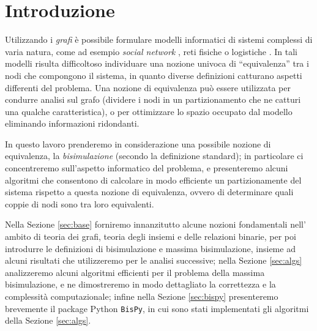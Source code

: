 \section{Introduzione}
Utilizzando i \emph{grafi} è possibile formulare modelli informatici di sistemi complessi di varia natura, come ad esempio \emph{social network} \cite{twitter}, reti fisiche \cite{electric} o logistiche \cite{supply}. In tali modelli risulta difficoltoso individuare una nozione univoca di ``equivalenza'' tra i nodi che compongono il sistema, in quanto diverse definizioni catturano aspetti differenti del problema. Una nozione di equivalenza può essere utilizzata per condurre analisi sul grafo (dividere i nodi in un partizionamento che ne catturi una qualche caratteristica), o per ottimizzare lo spazio occupato dal modello eliminando informazioni ridondanti.

In questo lavoro prenderemo in considerazione una possibile nozione di equivalenza, la \emph{bisimulazione} (secondo la definizione standard); in particolare ci concentreremo sull'aspetto informatico del problema, e presenteremo alcuni algoritmi che consentono di calcolare in modo efficiente un partizionamente del sistema rispetto a questa nozione di equivalenza, ovvero di determinare quali coppie di nodi sono tra loro equivalenti.

Nella Sezione \ref{sec:base} forniremo innanzitutto alcune nozioni fondamentali nell' ambito di teoria dei grafi, teoria degli insiemi e delle relazioni binarie, per poi introdurre le definizioni di bisimulazione e massima bisimulazione, insieme ad alcuni risultati che utilizzeremo per le analisi successive; nella Sezione \ref{sec:algs} analizzeremo alcuni algoritmi efficienti per il problema della massima bisimulazione, e ne dimostreremo in modo dettagliato la correttezza e la complessità computazionale; infine nella Sezione \ref{sec:bispy} presenteremo brevemente il package Python \texttt{BisPy}, in cui sono stati implementati gli algoritmi della Sezione \ref{sec:algs}.
